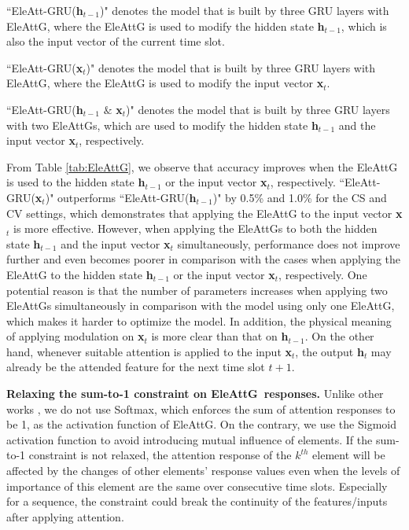 \documentclass[journal]{IEEEtran}
\newcommand{\EleAttG}{{EleAttG~}}
\begin{document}
``EleAtt-GRU(\textbf{h$_{t-1}$})" denotes the model that is built by three GRU layers with EleAttG, where the EleAttG is used to modify the hidden state \textbf{h$_{t-1}$}, which is also the input vector of the current time slot.

``EleAtt-GRU(\textbf{x$_t$})" denotes the model that is built by three GRU layers with EleAttG, where the EleAttG is used to modify the input vector \textbf{x$_t$}. 

``EleAtt-GRU(\textbf{h$_{t-1}$} $\&$ \textbf{x$_t$})" denotes the model that is built by three GRU layers with two EleAttGs, which are used to modify the hidden state \textbf{h$_{t-1}$} and the input vector \textbf{x$_t$}, respectively.

From Table \ref{tab:EleAttG}, we observe that accuracy improves when the EleAttG is used to the hidden state \textbf{h$_{t-1}$} or the input vector \textbf{x$_t$}, respectively. ``EleAtt-GRU(\textbf{x$_t$})" outperforms ``EleAtt-GRU(\textbf{h$_{t-1}$})" by 0.5\% and 1.0\% for the CS and CV settings, which demonstrates that applying the EleAttG to the input vector \textbf{x$_t$} is more effective. However, when applying the EleAttGs to both the hidden state \textbf{h$_{t-1}$} and the input vector \textbf{x$_t$} simultaneously, performance does not improve further and even becomes poorer in comparison with the cases when applying the EleAttG to the hidden state \textbf{h$_{t-1}$} or the input vector \textbf{x$_t$}, respectively. One potential reason is that the number of parameters increases when applying two EleAttGs simultaneously in comparison with the model using only one EleAttG, which makes it harder to optimize the model. In addition, the physical meaning of applying modulation on \textbf{x$_t$} is more clear than that on \textbf{h$_{t-1}$}. On the other hand, whenever suitable attention is applied to the input \textbf{x$_t$}, the output \textbf{h$_{t}$} may already be the attended feature for the next time slot $t+1$.




\textbf{Relaxing the sum-to-1 constraint on \EleAttG responses.} Unlike other works \cite{xu2015show,song2017end,liu2017global}, we do not use Softmax, which enforces the sum of attention responses to be 1, as the activation function of EleAttG. On the contrary, we use the Sigmoid activation function to avoid introducing  mutual influence of elements. If the sum-to-1 constraint is not relaxed, the attention response of the $k^{th}$ element will be affected by the changes of other elements' response values even when the levels of importance of this element are the same over consecutive time slots. Especially for a sequence, the constraint could break the continuity of the features/inputs after applying attention.
\end{document}
